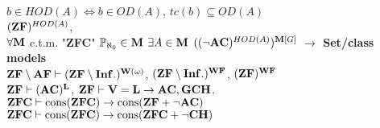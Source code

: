\documentclass[9pt]{article}
\newcommand{\class}[1]{{\bf #1}}
\newcommand{\Pp}{\mathbb{P}}
\newcommand{\mytitle}[1]{ {\bf $\rightarrow$ #1}\\}
\newcommand{\V}{\class{V}}
\newcommand{\M}{\class{M}}
\newcommand{\WF}{\class{WF}}
\begin{document}
\begin{multicols*}{2}
$b\in HOD(A)\Leftrightarrow b\in OD(A),\,tc(b)\subseteq OD(A)$\\
$(\class{ZF})^{HOD(A)}$,\\
$\forall \M$ c.t.m. "\class{ZFC}" $\Pp_{\aleph_0}\in\M$ $\exists A\in \M$ $((\neg\class{AC})^{HOD(A)})^{\M[G]}$
\mytitle{Set/class models}
$\class{ZF}\setminus \class{AF}\vdash (\class{ZF}\setminus \class{Inf.})^{\class{W}(\omega)}$, $(\class{ZF}\setminus \class{Inf.})^\WF$, $(\class{ZF})^\WF$\\
$\class{ZF}\vdash (\class{AC})^{\class{L}}$, $\class{ZF}\vdash \V=\class{L}\to \class{AC}, \class{GCH}$.\\
$\class{ZFC}\vdash \mbox{cons}(\class{ZFC})\to \mbox{cons}(\class{ZF}+\neg\class{AC})$\\
$\class{ZFC}\vdash \mbox{cons}(\class{ZFC})\to \mbox{cons}(\class{ZFC}+\neg \class{CH})$
\end{multicols*}
\end{document}
